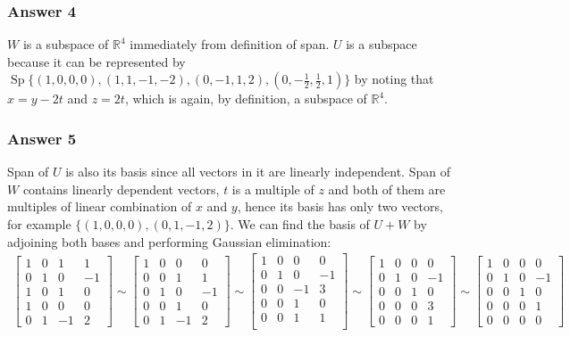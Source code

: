 \documentclass[11pt]{article}
\DeclareMathOperator{\Sp}{Sp}
\begin{document}
\subsubsection{Answer 4}
\label{sec-1-2-1}
$W$ is a subspace of $\mathbb{R}^4$ immediately from definition of span.
$U$ is a subspace because it can be represented by $\Sp\{(1,0,0,0),
    (1,1,-1,-2), (0,-1,1,2), (0,-\frac{1}{2},\frac{1}{2},1)\}$ by noting that $x
    = y - 2t$ and $z = 2t$, which is again, by definition, a subspace of
$\mathbb{R}^4$.

\subsubsection{Answer 5}
\label{sec-1-2-2}
Span of $U$ is also its basis since all vectors in it are linearly
independent.  Span of $W$ contains linearly dependent vectors, $t$ is a
multiple of $z$ and both of them are multiples of linear combination of $x$
and $y$, hence its basis has only two vectors, for example $\{(1,0,0,0),
    (0,1,-1,2)\}$.  We can find the basis of $U + W$ by adjoining both bases
and performing Gaussian elimination:
\begin{align*}
  \begin{bmatrix}
    1 & 0 & 1 & 1 \\
    0 & 1 & 0 & -1 \\ 
    1 & 0 & 1 & 0 \\
    1 & 0 & 0 & 0 \\
    0 & 1 & -1 & 2
  \end{bmatrix} \sim
  \begin{bmatrix}
    1 & 0 & 0 & 0 \\
    0 & 0 & 1 & 1 \\
    0 & 1 & 0 & -1 \\ 
    0 & 0 & 1 & 0 \\
    0 & 1 & -1 & 2
  \end{bmatrix} \sim
  \begin{bmatrix}
    1 & 0 & 0 & 0 \\
    0 & 1 & 0 & -1 \\ 
    0 & 0 & -1 & 3 \\
    0 & 0 & 1 & 0 \\
    0 & 0 & 1 & 1 \\
  \end{bmatrix} \sim
  \begin{bmatrix}
    1 & 0 & 0 & 0 \\
    0 & 1 & 0 & -1 \\ 
    0 & 0 & 1 & 0 \\
    0 & 0 & 0 & 3 \\
    0 & 0 & 0 & 1
  \end{bmatrix} \sim
  \begin{bmatrix}
    1 & 0 & 0 & 0 \\
    0 & 1 & 0 & -1 \\ 
    0 & 0 & 1 & 0 \\
    0 & 0 & 0 & 1 \\
    0 & 0 & 0 & 0
  \end{bmatrix}
\end{align*}
\end{document}
